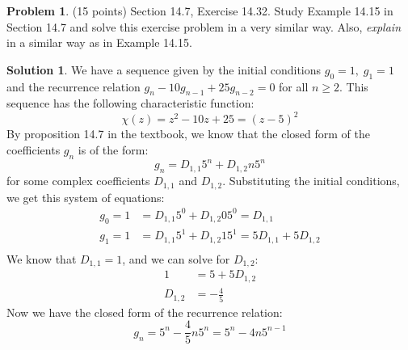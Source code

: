 \documentclass{article}
\theoremstyle{definition}
\newtheorem{problem}{Problem}
\newtheorem*{solution}{Solution}
\begin{document}
\newpage
\begin{problem} (15 points) Section 14.7, Exercise 14.32.  Study Example 14.15
in Section 14.7 and solve this exercise problem in a very similar way.  Also, 
\textit{explain} in a similar way as in Example 14.15.
\end{problem}
\begin{solution}
We have a sequence given by the initial conditions $g_0 = 1,\; g_1 = 1$ and the recurrence relation
$g_n - 10g_{n-1} + 25g_{n-2} = 0$ for all $n \geq 2$.
This sequence has the following characteristic function:
$$ \chi(z) = z^2 - 10z + 25 = (z - 5)^2 $$
By proposition 14.7 in the textbook, we know that the closed form of the coefficients $g_n$ is of the form:
$$ g_n = D_{1, 1} 5^n + D_{1, 2} n 5^n $$
for some complex coefficients $D_{1, 1}$ and $D_{1, 2}$.
Substituting the initial conditions, we get this system of equations:
\begin{align*}
g_0 = 1 &= D_{1, 1} 5^0 + D_{1, 2} 0 5^0 = D_{1, 1} \\
g_1 = 1 &= D_{1, 1} 5^1 + D_{1, 2} 1 5^1 = 5D_{1, 1} + 5D_{1, 2} \\
\end{align*}
We know that $D_{1, 1} = 1$, and we can solve for $D_{1, 2}$:
\begin{align*}
1 &= 5 + 5D_{1, 2} \\
D_{1, 2} &= -\frac{4}{5}
\end{align*}
Now we have the closed form of the recurrence relation:
$$ g_n = 5^n - \frac{4}{5} n 5^n = 5^n - 4n 5^{n-1} $$
\end{solution}
\end{document}
